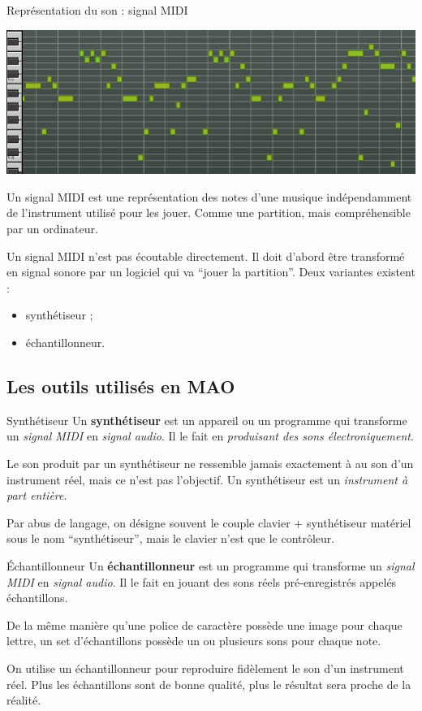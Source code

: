 \documentclass{beamer}
\newcommand\danger[1][2ex]{%
  \renewcommand\stacktype{L}%
  \scaleto{\stackon[1.3pt]{\color{red}$\triangle$}{\tiny !}}{#1}%
}
\begin{document}
\begin{frame}{Représentation du son : signal MIDI}
  \begin{center}
  \includegraphics[scale=0.4]{signal_midi.png}
  \end{center}
  
  Un signal MIDI est une représentation des notes d'une musique indépendamment de l'instrument utilisé pour les jouer. Comme une partition, mais compréhensible par un ordinateur.
  \medskip
  
  Un signal MIDI n'est pas écoutable directement. Il doit d'abord être transformé en signal sonore par un logiciel qui va ``jouer la partition''. Deux variantes existent :
  \begin{itemize}
  \item synthétiseur ;
  \item échantillonneur.
  \end{itemize}
\end{frame}

\subsection{Les outils utilisés en MAO}
\begin{frame}{Synthétiseur}
  Un \textbf{synthétiseur} est un appareil ou un programme qui transforme un \emph{signal MIDI} en \emph{signal audio}. Il le fait en \emph{produisant des sons électroniquement}.
  \medskip
  
  Le son produit par un synthétiseur ne ressemble jamais exactement à au son d'un instrument réel, mais ce n'est pas l'objectif. Un synthétiseur est un \emph{instrument à part entière}.
  \medskip
  
  \danger{} Par abus de langage, on désigne souvent le couple clavier + synthétiseur matériel sous le nom ``synthétiseur'', mais le clavier n'est que le contrôleur.
\end{frame}

\begin{frame}{Échantillonneur}
  Un \textbf{échantillonneur} est un programme qui transforme un \emph{signal MIDI} en \emph{signal audio}. Il le fait en jouant des sons réels pré-enregistrés appelés échantillons.
  \medskip
  
  De la même manière qu'une police de caractère possède une image pour chaque lettre, un set d'échantillons possède un ou plusieurs sons pour chaque note.
  \medskip
  
  On utilise un échantillonneur pour reproduire fidèlement le son d'un instrument réel. Plus les échantillons sont de bonne qualité, plus le résultat sera proche de la réalité.
\end{frame}
\end{document}
